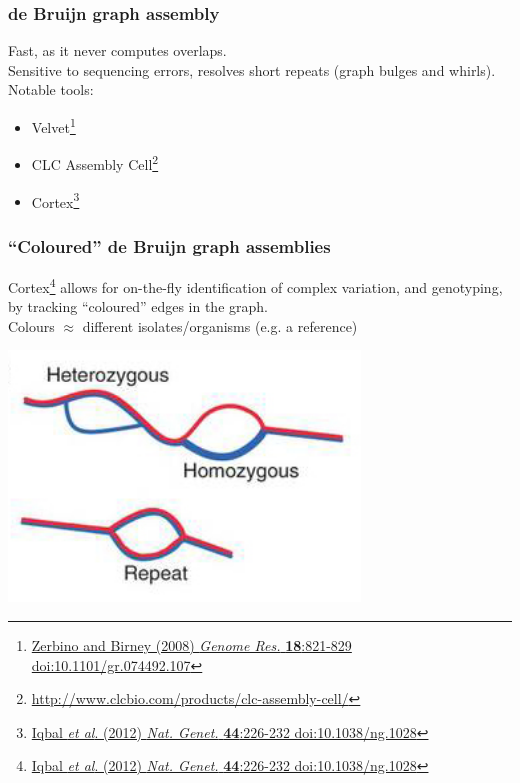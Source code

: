 \begin{frame}
  \frametitle{de Bruijn graph assembly}
  Fast, as it never computes overlaps.\\[0.5cm]
  Sensitive to sequencing errors, resolves short repeats (graph bulges and whirls).\\[0.5cm]
  Notable tools:
  \begin{itemize}
    \item Velvet\footnote{\tiny{\href{http://dx.doi.org/10.1101/gr.074492.107}{Zerbino and Birney (2008) \textit{Genome Res.} \textbf{18}:821-829 doi:10.1101/gr.074492.107}}}
    \item CLC Assembly Cell\footnote{\tiny{\href{http://www.clcbio.com/products/clc-assembly-cell/}{http://www.clcbio.com/products/clc-assembly-cell/}}}
    \item Cortex\footnote{\tiny{\href{http://dx.doi.org/10.1038/ng.1028}{Iqbal \textit{et al}. (2012) \textit{Nat. Genet.} \textbf{44}:226-232 doi:10.1038/ng.1028}}}
  \end{itemize}
\end{frame}

\begin{frame}
  \frametitle{``Coloured'' de Bruijn graph assemblies}
  Cortex\footnote{\tiny{\href{http://dx.doi.org/10.1038/ng.1028}{Iqbal \textit{et al}. (2012) \textit{Nat. Genet.} \textbf{44}:226-232 doi:10.1038/ng.1028}}} allows for on-the-fly identification of complex variation, and genotyping, by tracking ``coloured'' edges in the graph.\\
  Colours $\approx$ different isolates/organisms (e.g. a reference)
  \begin{center}
    \includegraphics[width=0.7\textwidth]{images/cortex_uses}
  \end{center}  
\end{frame}


